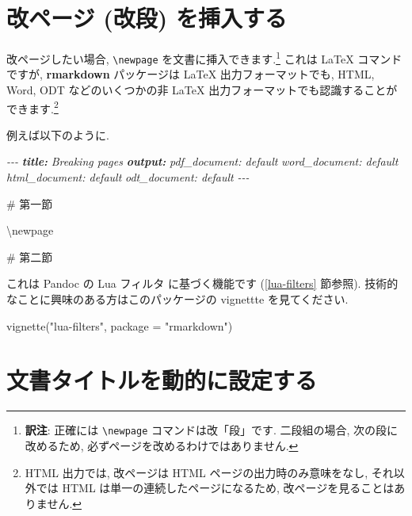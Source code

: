 \documentclass[
  11pt,
]{bxjsreport}
\newenvironment{Shaded}{\begin{snugshade}}{\end{snugshade}}
\newcommand{\AnnotationTok}[1]{\textcolor[rgb]{0.56,0.35,0.01}{\textbf{\textit{#1}}}}
\newcommand{\AttributeTok}[1]{\textcolor[rgb]{0.77,0.63,0.00}{#1}}
\newcommand{\CommentTok}[1]{\textcolor[rgb]{0.56,0.35,0.01}{\textit{#1}}}
\newcommand{\FunctionTok}[1]{\textcolor[rgb]{0.00,0.00,0.00}{#1}}
\newcommand{\NormalTok}[1]{#1}
\newcommand{\StringTok}[1]{\textcolor[rgb]{0.31,0.60,0.02}{#1}}
\begin{document}
\hypertarget{pagebreaks}{%
\section{改ページ (改段) を挿入する}\label{pagebreaks}}

改ページしたい場合, \texttt{\textbackslash{}newpage} を文書に挿入できます.\footnote{\textbf{訳注}: 正確には \texttt{\textbackslash{}newpage} コマンドは改「段」です. 二段組の場合, 次の段に改めるため, 必ずページを改めるわけではありません.} これは LaTeX コマンドですが, \textbf{rmarkdown} パッケージは LaTeX 出力フォーマットでも, HTML, Word, ODT などのいくつかの非 LaTeX 出力フォーマットでも認識することができます.\footnote{HTML 出力では, 改ページは HTML ページの出力時のみ意味をなし, それ以外では HTML は単一の連続したページになるため, 改ページを見ることはありません.}

例えば以下のように.

\begin{Shaded}
\begin{Highlighting}[]
\CommentTok{{-}{-}{-}}
\AnnotationTok{title:}\CommentTok{ Breaking pages}
\AnnotationTok{output:}
\CommentTok{  pdf\_document: default}
\CommentTok{  word\_document: default}
\CommentTok{  html\_document: default}
\CommentTok{  odt\_document: default}
\CommentTok{{-}{-}{-}}

\FunctionTok{\# 第一節}

\NormalTok{\textbackslash{}newpage}

\FunctionTok{\# 第二節}
\end{Highlighting}
\end{Shaded}

これは Pandoc の Lua フィルタ に基づく機能です (\ref{lua-filters} 節参照). 技術的なことに興味のある方はこのパッケージの vignettte を見てください.

\begin{Shaded}
\begin{Highlighting}[]
\FunctionTok{vignette}\NormalTok{(}\StringTok{"lua{-}filters"}\NormalTok{, }\AttributeTok{package =} \StringTok{"rmarkdown"}\NormalTok{)}
\end{Highlighting}
\end{Shaded}

\hypertarget{dynamic-yaml}{%
\section{文書タイトルを動的に設定する}\label{dynamic-yaml}}
\end{document}
